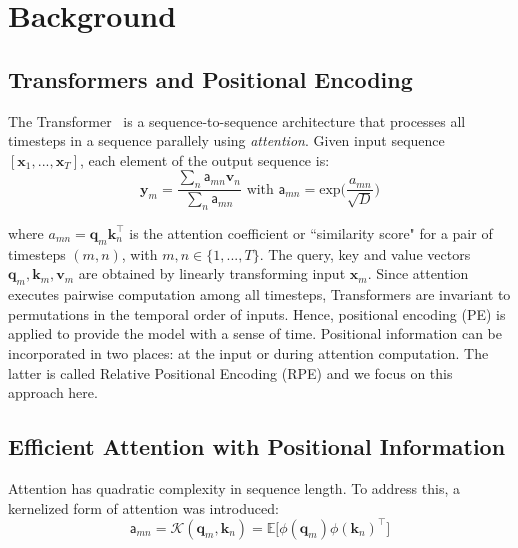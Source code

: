 \section{Background}
\label{section:background}

\subsection{Transformers and Positional Encoding}

The Transformer~\cite{vaswani_attention_2017} is a sequence-to-sequence architecture that processes all timesteps in a sequence parallely using \textit{attention}. Given input sequence $[\mathbf{x}_1 , ... , \mathbf{x}_T]$, each element of the output sequence is:
\begin{equation}
    \mathbf{y}_m = \frac{\sum_n \mathsf{a}_{m n} \mathbf{v}_n}{\sum_n \mathsf{a}_{m n}} \text{ with } \mathsf{a}_{mn} = \text{exp} \bigg( \frac{a_{mn}}{\sqrt{D}} \bigg)
\end{equation}

where $a_{mn} = \mathbf{q}_m \mathbf{k}_n^\top$ is the attention coefficient or ``similarity score" for a pair of timesteps $(m,n)$, with $m, n \in \{1, ..., T\}$.
The query, key and value vectors $\mathbf{q}_m, \mathbf{k}_m, \mathbf{v}_m$ are obtained by linearly transforming input $\mathbf{x}_m$. Since attention executes pairwise computation among all timesteps, Transformers are invariant to permutations in the temporal order of inputs. Hence, positional encoding (PE) is applied to provide the model with a sense of time. Positional information can be incorporated in two places: at the input or during attention computation. The latter is called Relative Positional Encoding (RPE) and we focus on this approach here.

\subsection{Efficient Attention with Positional Information}

Attention has quadratic complexity in sequence length. To address this, a kernelized form of attention was introduced:
\begin{equation} \label{eq:attention_approx}
    \mathsf{a}_{mn} = \mathcal{K} ( \mathbf{q}_m , \mathbf{k}_n ) = \mathbb{E} \Big[ \phi(\mathbf{q}_m) \phi(\mathbf{k}_n)^{\top} \Big]
\end{equation}

